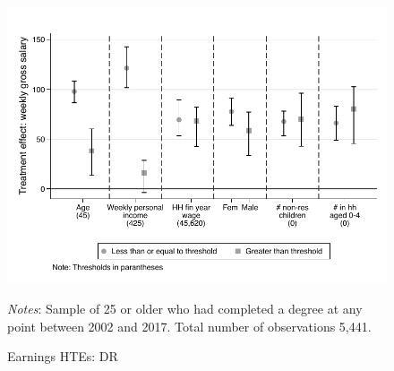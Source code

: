 \documentclass[12pt, a4paper]{article}
\begin{document}

%

\begin{figure}[htbp]
\centering
\caption{Earnings HTEs: DR}
\vspace{0.5cm}
  \label{fig:htedr}
    \includegraphics{_figures/hte_earnings_GL_100_DR.pdf}
\parbox{1\textwidth}{\footnotesize{\textit{Notes}: Sample of 25 or older who had completed a degree at any point between 2002 and 2017. Total number of observations 5,441.}}
\end{figure}
\end{document}

